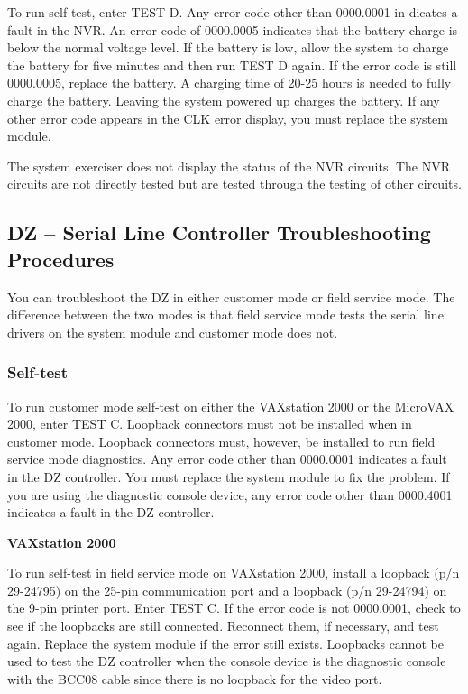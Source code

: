 To run self-test, enter TEST D. Any error code other than 0000.0001 in
dicates a fault in the NVR. An error code of 0000.0005 indicates that the
battery charge is below the normal voltage level. If the battery is low, allow 
the system to charge the battery for five minutes and then run TEST D
again. If the error code is still 0000.0005, replace the battery. A charging
time of 20-25 hours is needed to fully charge the battery. Leaving the system 
powered up charges the battery. If any other error code appears in the
CLK error display, you must replace the system module.

The system exerciser does not display the status of the NVR circuits. The
NVR circuits are not directly tested but are tested through the testing of
other circuits.

\subsection{DZ -- Serial Line Controller Troubleshooting Procedures}

You can troubleshoot the DZ in either customer mode or field service mode.
The difference between the two modes is that field service mode tests the
serial line drivers on the system module and customer mode does not.

\subsubsection{Self-test}

To run customer mode self-test on either the VAXstation 2000 or the 
MicroVAX 2000, enter TEST C. Loopback connectors must not be installed
when in customer mode. Loopback connectors must, however, be installed
to run field service mode diagnostics. Any error code other than 0000.0001
indicates a fault in the DZ controller. You must replace the system module
to fix the problem. If you are using the diagnostic console device, any error
code other than 0000.4001 indicates a fault in the DZ controller.

\textbf{VAXstation 2000}

To run self-test in field service mode on VAXstation 2000, install a loopback
(p/n 29-24795) on the 25-pin communication port and a loopback (p/n 29-24794) 
on the 9-pin printer port. Enter TEST C. If the error code is not
0000.0001, check to see if the loopbacks are still connected. Reconnect
them, if necessary, and test again. Replace the system module if the error
still exists. Loopbacks cannot be used to test the DZ controller when the
console device is the diagnostic console with the BCC08 cable since there
is no loopback for the video port.

